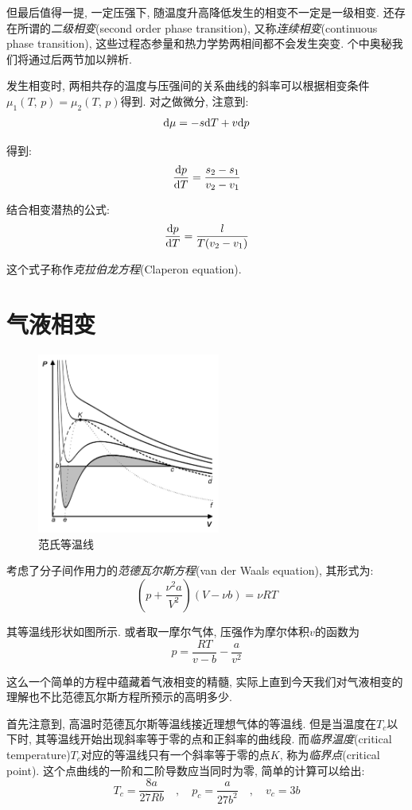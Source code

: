 但最后值得一提, 一定压强下, 随温度升高降低发生的相变不一定是一级相变. 还存在所谓的\emph{二级相变}(second order phase transition), 又称\emph{连续相变}(continuous phase transition), 这些过程态参量和热力学势两相间都不会发生突变. 个中奥秘我们将通过后两节加以辨析.

发生相变时, 两相共存的温度与压强间的关系曲线的斜率可以根据相变条件$\mu_1(T,\,p)=\mu_2(T,\,p)$得到. 对之做微分, 注意到:
\[\textrm{d} \mu=-s\textrm{d} T+v\textrm{d} p\]

得到:
\[\frac{\textrm{d} p}{\textrm{d} T}=\frac{s_2-s_1}{v_2-v_1}\]

结合相变潜热的公式:
\[\frac{\textrm{d} p}{\textrm{d} T}=\frac{l}{T(v_2-v_1)}\]

这个式子称作\emph{克拉伯龙方程}(Claperon equation).


\section{气液相变}
\begin{figure}
\centering
\includegraphics[width=6cm]{image/5-3-6.png}
\caption{范氏等温线}
\end{figure}
考虑了分子间作用力的\emph{范德瓦尔斯方程}(van der Waals equation), 其形式为:
\[\left(p+\frac{\nu^2 a}{V^2}\right)(V-\nu b)=\nu RT\]

其等温线形状如图所示. 或者取一摩尔气体, 压强作为摩尔体积$v$的函数为
\[p=\frac{RT}{v-b}-\frac{a}{v^2}\]

这么一个简单的方程中蕴藏着气液相变的精髓, 实际上直到今天我们对气液相变的理解也不比范德瓦尔斯方程所预示的高明多少.

首先注意到, 高温时范德瓦尔斯等温线接近理想气体的等温线. 但是当温度在$T_c$以下时, 其等温线开始出现斜率等于零的点和正斜率的曲线段. 而\emph{临界温度}(critical temperature)$T_c$对应的等温线只有一个斜率等于零的点$K$, 称为\emph{临界点}(critical point). 这个点曲线的一阶和二阶导数应当同时为零, 简单的计算可以给出:
\[T_c= \frac{8a}{27Rb} \quad,\quad p_c=\frac{a}{27 b^2} \quad,\quad v_c=3b\]

